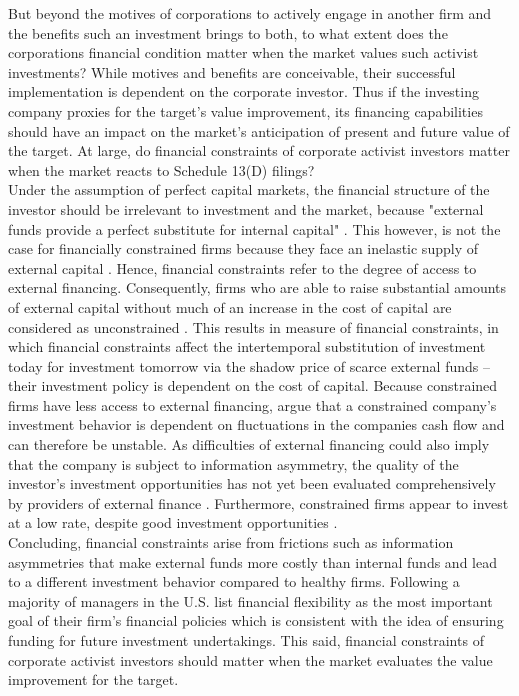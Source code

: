 \documentclass[12pt]{article}
\begin{document}
But beyond the motives of corporations to actively engage in another firm and the benefits such an investment brings to both, to what extent does the corporations financial condition matter when the market values such activist investments?  While motives and benefits are conceivable, their successful implementation is dependent on the corporate investor. 
Thus if the investing company proxies for the target's value improvement, its financing capabilities should have an impact on the market's anticipation of present and future value of the target. At large, do financial constraints of corporate activist investors matter when the market reacts to Schedule 13(D) filings?\\
Under the assumption of perfect capital markets, the financial structure of the investor should be irrelevant to investment and the market, because "external funds provide a perfect substitute for internal capital" \citep[p. 141]{Fazzari1988}. This however, is not the case for financially constrained firms because they face an inelastic supply of external capital \citep[p.1]{Farre-mensa2013}. Hence, financial constraints refer to the degree of access to external financing. Consequently, firms who are able to raise substantial amounts of external capital without much of an increase in the cost of capital are considered as unconstrained \citep[p.1]{Farre-mensa2013}. This results in \citet[p.531]{Whited2006} measure of financial constraints, in which financial constraints affect the intertemporal substitution of investment today for investment tomorrow via the shadow price of scarce external funds -- their investment policy is dependent on the cost of capital. Because constrained firms have less access to external financing, \citet[p. 142]{Fazzari1988} argue that a constrained company's investment behavior is dependent on fluctuations in the companies cash flow and can therefore be unstable. As difficulties of external financing could also imply that the company is subject to information asymmetry, the quality of the investor's investment opportunities has not yet been evaluated comprehensively by providers of external finance \citep[p.142]{Fazzari1988}. Furthermore, constrained firms appear to invest at a low rate, despite good investment opportunities \citep[p.533]{Whited2006}.\\
Concluding, financial constraints arise from frictions such as information asymmetries that make external funds more costly than internal funds and lead to a different investment behavior compared to healthy firms. 
Following \citet[p.691]{Almeida2011a} a majority of managers in the U.S. list financial flexibility as the most important goal of their firm's financial policies which is consistent with the idea of ensuring funding for future investment undertakings. This said, financial constraints of corporate activist investors should matter when the market evaluates the value improvement for the target.
\end{document}
